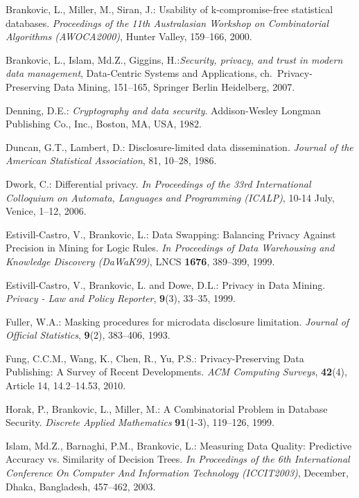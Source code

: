 \documentclass{llncs}
\begin{document}
\begin{thebibliography}{10}
Brankovic, L., Miller, M., Siran, J.:
Usability of k-compromise-free statistical databases.
\emph{Proceedings of the 11th Australasian Workshop on Combinatorial Algorithms (AWOCA2000)}, Hunter Valley, 159--166, 2000.

Brankovic, L.,  Islam, Md.Z., Giggins, H.:\emph{Security,
  privacy, and trust in modern data management}, Data-Centric Systems and
  Applications, ch.~Privacy-Preserving Data Mining, 151--165, Springer
  Berlin Heidelberg, 2007.

Denning, D.E.: \emph{Cryptography and data security}.
  Addison-Wesley Longman Publishing Co., Inc., Boston, MA, USA, 1982.

Duncan, G.T.,  Lambert, D.: {Disclosure-limited data
  dissemination}. \emph{Journal of the American Statistical Association},
  81, 10--28, 1986.

Dwork, C.: Differential privacy. \emph{In Proceedings of the 33rd International Colloquium on Automata, Languages and Programming (ICALP)}, 10-14 July, Venice, 1--12, 2006.

Estivill-Castro, V., Brankovic, L.:
Data Swapping: Balancing Privacy Against Precision in Mining for Logic Rules.
\emph{In Proceedings of Data Warehousing and Knowledge Discovery (DaWaK99)}, LNCS \textbf{1676}, 389--399, 1999.

Estivill-Castro, V.,  Brankovic, L.  and Dowe, D.L.: 
Privacy in Data Mining. \emph{Privacy - Law and Policy Reporter}, \textbf{9}(3),  33--35, 1999.

Fuller, W.A.: Masking procedures for microdata disclosure limitation.
  \emph{Journal of Official Statistics}, \textbf{9}(2),  383--406, 1993.

Fung, C.C.M., Wang, K.,  Chen, R., Yu, P.S.:
Privacy-Preserving Data Publishing: A Survey of
Recent Developments. \emph{ACM Computing Surveys},  \textbf{42}(4),
Article 14,  14.2--14.53, 2010.



Horak, P.,  Brankovic, L., Miller, M.: {A Combinatorial Problem in Database Security}. \emph{Discrete Applied Mathematics} \textbf{91}(1-3),
   119--126, 1999.
	
Islam, Md.Z., Barnaghi, P.M., Brankovic, L.:
Measuring Data Quality: Predictive Accuracy vs. Similarity of Decision Trees.
\emph{In Proceedings of the 6th International Conference On Computer And Information Technology (ICCIT2003)}, December, Dhaka, Bangladesh, 457--462, 2003.


\end{thebibliography}
\end{document}
